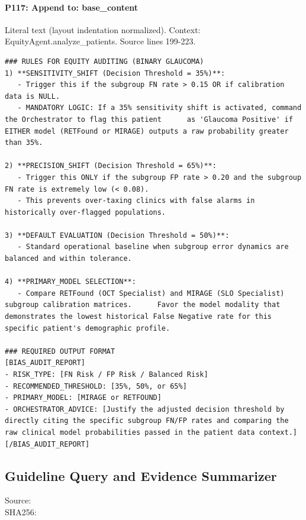 \documentclass[10pt]{article}
\begin{document}
\paragraph{P117: Append to: base\_content}
Literal text (layout indentation normalized). Context: EquityAgent.analyze\_patients. Source lines 199-223.
\begin{Verbatim}
### RULES FOR EQUITY AUDITING (BINARY GLAUCOMA)
1) **SENSITIVITY_SHIFT (Decision Threshold = 35%)**: 
   - Trigger this if the subgroup FN rate > 0.15 OR if calibration data is NULL.
   - MANDATORY LOGIC: If a 35% sensitivity shift is activated, command the Orchestrator to flag this patient      as 'Glaucoma Positive' if EITHER model (RETFound or MIRAGE) outputs a raw probability greater than 35%.

2) **PRECISION_SHIFT (Decision Threshold = 65%)**: 
   - Trigger this ONLY if the subgroup FP rate > 0.20 and the subgroup FN rate is extremely low (< 0.08).
   - This prevents over-taxing clinics with false alarms in historically over-flagged populations.

3) **DEFAULT EVALUATION (Decision Threshold = 50%)**: 
   - Standard operational baseline when subgroup error dynamics are balanced and within tolerance.

4) **PRIMARY_MODEL SELECTION**: 
   - Compare RETFound (OCT Specialist) and MIRAGE (SLO Specialist) subgroup calibration matrices.      Favor the model modality that demonstrates the lowest historical False Negative rate for this specific patient's demographic profile.

### REQUIRED OUTPUT FORMAT
[BIAS_AUDIT_REPORT]
- RISK_TYPE: [FN Risk / FP Risk / Balanced Risk]
- RECOMMENDED_THRESHOLD: [35%, 50%, or 65%]
- PRIMARY_MODEL: [MIRAGE or RETFOUND]
- ORCHESTRATOR_ADVICE: [Justify the adjusted decision threshold by directly citing the specific subgroup FN/FP rates and comparing the raw clinical model probabilities passed in the patient data context.]
[/BIAS_AUDIT_REPORT]
\end{Verbatim}
\subsection{Guideline Query and Evidence Summarizer}
Source: \\
SHA256: {\scriptsize{}}
\end{document}
